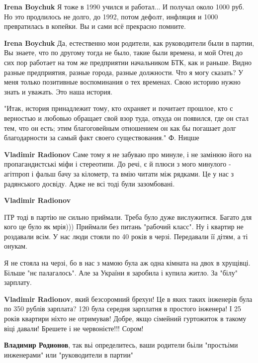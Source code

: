 \begin{itemize}
\begin{itemize}
\textbf{Irena Boychuk} Я тоже в 1990 учился и работал... И получал около 1000 руб. Но это продлилось не долго, до 1992, потом дефолт, инфляция и 1000 превратилась в копейки. Вы и сами всё прекрасно помните.


\textbf{Irena Boychuk} Да, естественно мои родители, как руководители были в
партии, Вы знаете, что по другому тогда не было, такие были времена, и мой Отец
до сих пор работает на том же предприятии начальником БТК, как и раньше. Видно
разные предприятия, разные города, разные должности. Что я могу сказать? У меня
только позитивные воспоминания о тех временах. Свою историю нужно знать и
уважать. Это наша история.



"Итак, история принадлежит тому, кто охраняет и почитает прошлое, кто с
верностью и любовью обращает свой взор туда, откуда он появился, где он стал
тем, что он есть; этим благоговейным отношением он как бы погашает долг
благодарности за самый факт своего существования." Ф. Ницше


\textbf{Vladimir Radionov} Саме тому я не забуваю про минуле, і не замінюю його на пропагандистські міфи і стереотипи. До речі, є й плюси з мого минулого - агітпроп і фальш бачу за кілометр, та вмію читати між рядками. Це у нас з радянського досвіду. Адже не всі тоді були зазомбовані.

\textbf{Vladimir Radionov} 

ІТР тоді в партію не сильно приймали. Треба було дуже вислужитися. Багато для
кого це було як мрія))) Приймали без питань "рабочий класс". Ну і квартир не
роздавали всім. У нас люди стояли по 40 років в черзі. Передавали її дітям, а
ті онукам.

Я не стояла на черзі, бо в нас з мамою була аж одна кімната на двох в хрущівці.
Більше "нє палагалось". Але за України я заробила і купила житло. За "білу"
зарплату.

\textbf{Vladimir Radionov}, який безсоромний брехун! Це в яких таких інженерів була по 350 рублів зарплата? 120 була середня зарплатня в простого інженера! І 25 років квартири ніхто не отримував! Добре, якщо сімейний гуртожиток в такому віці давали! Брешете і не червонієте!!! Сором!

\textbf{Владимир Родионов}, так вьі определитесь, ваши родители бьіли "простьіми инженерами" или "руководители в партии"


\end{itemize}
\end{itemize}
